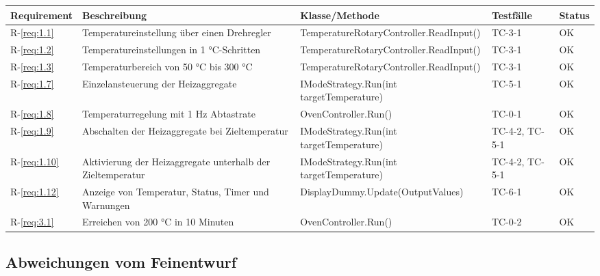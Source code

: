 \documentclass[a4paper,12pt]{article}
\begin{document}
\begin{tabular}{|l|p{5cm}|l|l|l|}
\hline
\textbf{Requirement} & \textbf{Beschreibung} & \textbf{Klasse/Methode} & \textbf{Testfälle} & \textbf{Status} \\
\hline
R-\ref{req:1.1} & Temperatureinstellung über einen Drehregler & TemperatureRotaryController.ReadInput() & TC-3-1 & OK \\
\hline
R-\ref{req:1.2} & Temperatureinstellungen in 1 °C-Schritten & TemperatureRotaryController.ReadInput() & TC-3-1 & OK \\
\hline
R-\ref{req:1.3} & Temperaturbereich von 50 °C bis 300 °C & TemperatureRotaryController.ReadInput() & TC-3-1 & OK \\
\hline
R-\ref{req:1.7} & Einzelansteuerung der Heizaggregate & IModeStrategy.Run(int targetTemperature) & TC-5-1 & OK \\
\hline
R-\ref{req:1.8} & Temperaturregelung mit 1 Hz Abtastrate & OvenController.Run() & TC-0-1 & OK \\
\hline
R-\ref{req:1.9} & Abschalten der Heizaggregate bei Zieltemperatur & IModeStrategy.Run(int targetTemperature) & TC-4-2, TC-5-1 & OK \\
\hline
R-\ref{req:1.10} & Aktivierung der Heizaggregate unterhalb der Zieltemperatur & IModeStrategy.Run(int targetTemperature) & TC-4-2, TC-5-1 & OK \\
\hline
R-\ref{req:1.12} & Anzeige von Temperatur, Status, Timer und Warnungen & DisplayDummy.Update(OutputValues) & TC-6-1 & OK \\
\hline
R-\ref{req:3.1} & Erreichen von 200 °C in 10 Minuten & OvenController.Run() & TC-0-2 & OK \\
\hline
\end{tabular}

\subsection{Abweichungen vom Feinentwurf}
\end{document}
